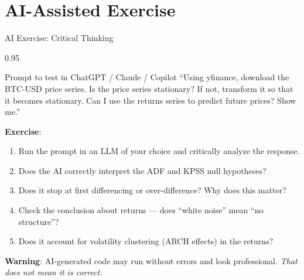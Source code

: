 \documentclass[9pt, aspectratio=169, t]{beamer}
\begin{document}
\section{AI-Assisted Exercise}

\begin{frame}{AI Exercise: Critical Thinking}
    \begin{cminipage}{0.95\textwidth}
    \vspace{-0.3cm}
    \begin{block}{\footnotesize Prompt to test in ChatGPT / Claude / Copilot}
        {\footnotesize
        ``Using yfinance, download the BTC-USD price series. Is the price series stationary? If not, transform it so that it becomes stationary. Can I use the returns series to predict future prices? Show me.''
        }
    \end{block}
    \vspace{-2mm}
    {\footnotesize
    \textbf{Exercise}:
    \begin{enumerate}\setlength{\itemsep}{0pt}
        \item Run the prompt in an LLM of your choice and critically analyze the response.
        \item Does the AI correctly interpret the ADF and KPSS null hypotheses?
        \item Does it stop at first differencing or over-difference? Why does this matter?
        \item Check the conclusion about returns --- does ``white noise'' mean ``no structure''?
        \item Does it account for volatility clustering (ARCH effects) in the returns?
    \end{enumerate}
    }
    \vspace{-2mm}
    \begin{alertblock}{}
        {\footnotesize \textbf{Warning}: AI-generated code may run without errors and look professional. \textit{That does not mean it is correct.}}
    \end{alertblock}
    \end{cminipage}
\end{frame}

\end{document}

